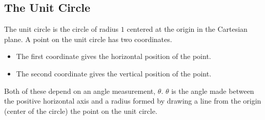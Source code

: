 \documentclass{ximera}
\begin{document}
\subsection*{The Unit Circle}


The unit circle is the circle of radius $1$ centered at the origin in the Cartesian plane. A point on the unit circle has two coordinates.  

\begin{itemize}
\item The first coordinate gives the horizontal position of the point. 
\item The second coordinate gives the vertical position of the point.  
\end{itemize}

Both of these depend on an angle measurement, $\theta$. $\theta$ is the angle made between the positive horizontal axis and a radius formed by drawing a line from the origin (center of the circle) the point on the unit circle.
\end{document}
